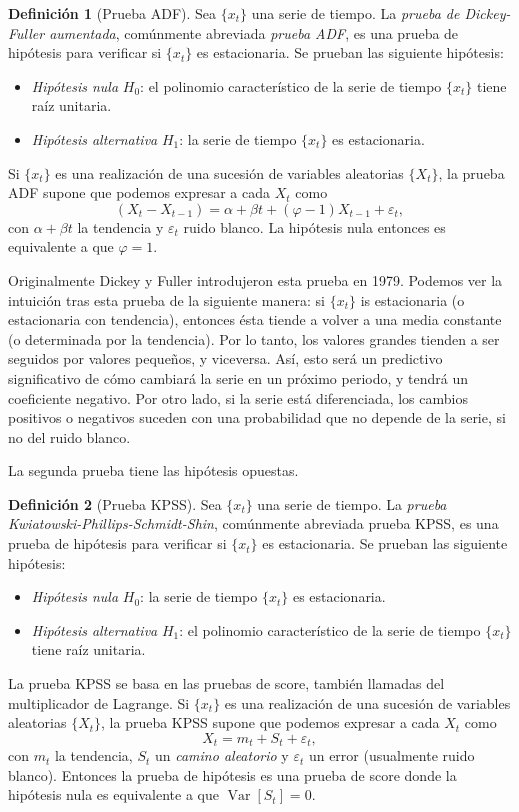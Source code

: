 \documentclass[11pt,letterpaper]{article}
\newcommand{\variance}{\ensuremath{\operatorname{Var}}}
\theoremstyle{definition}
\newtheorem{definition}{Definición}[section]
\theoremstyle{theorem}
\theoremstyle{remark}
\begin{document}
	\begin{definition}[Prueba ADF] \label{defADF}
		Sea \(\{x_t\}\) una serie de tiempo. La \textit{prueba de Dickey-Fuller aumentada}, comúnmente abreviada \textit{prueba ADF}, es una prueba de hipótesis para verificar si \(\{x_t\}\) es estacionaria. Se prueban las siguiente hipótesis:
		\begin{itemize}
			\item \textit{Hipótesis nula} \(H_0\): el polinomio característico de la serie de tiempo \(\{x_t\}\) tiene raíz unitaria.
			\item \textit{Hipótesis alternativa} \(H_1\): la serie de tiempo \(\{x_t\}\) es estacionaria.
		\end{itemize}
		Si \(\{x_t\}\) es una realización de una sucesión de variables aleatorias \(\{X_t\}\), la prueba ADF supone que podemos expresar a cada \(X_t\) como \[(X_t-X_{t-1})=\alpha+\beta t+(\varphi-1)X_{t-1}+\varepsilon_t,\] con \(\alpha+\beta t\) la tendencia y \(\varepsilon_t\) ruido blanco. La hipótesis nula entonces es equivalente a que \(\varphi=1\).
	\end{definition}
	Originalmente Dickey y Fuller introdujeron esta prueba en 1979\autocite{dickeyfuller}. Podemos ver la intuición tras esta prueba de la siguiente manera: si \(\{x_t\}\) is estacionaria (o estacionaria con tendencia), entonces ésta tiende a volver a una media constante (o determinada por la tendencia). Por lo tanto, los valores grandes tienden a ser seguidos por valores pequeños, y viceversa. Así, esto será un predictivo significativo de cómo cambiará la serie en un próximo periodo, y tendrá un coeficiente negativo. Por otro lado, si la serie está diferenciada, los cambios positivos o negativos suceden con una probabilidad que no depende de la serie, si no del ruido blanco. \par
	La segunda prueba tiene las hipótesis opuestas.
	\begin{definition}[Prueba KPSS] \label{defKPSS}
		Sea \(\{x_t\}\) una serie de tiempo. La \textit{prueba Kwiatowski-Phillips-Schmidt-Shin}, comúnmente abreviada {\rm prueba KPSS}, es una prueba de hipótesis para verificar si \(\{x_t\}\) es estacionaria. Se prueban las siguiente hipótesis:
		\begin{itemize}
			\item \textit{Hipótesis nula} \(H_0\): la serie de tiempo \(\{x_t\}\) es estacionaria.
			\item \textit{Hipótesis alternativa} \(H_1\): el polinomio característico de la serie de tiempo \(\{x_t\}\) tiene raíz unitaria.
		\end{itemize}
		La prueba KPSS se basa en las pruebas de score, también llamadas del multiplicador de Lagrange. Si \(\{x_t\}\) es una realización de una sucesión de variables aleatorias \(\{X_t\}\), la prueba KPSS supone que podemos expresar a cada \(X_t\) como \[X_t=m_t+S_t+\varepsilon_t,\] con \(m_t\) la tendencia, \(S_t\) un \textit{camino aleatorio} y \(\varepsilon_t\) un error (usualmente ruido blanco). Entonces la prueba de hipótesis es una prueba de score donde la hipótesis nula es equivalente a que \(\variance[S_t]=0\).
	\end{definition}
\end{document}
